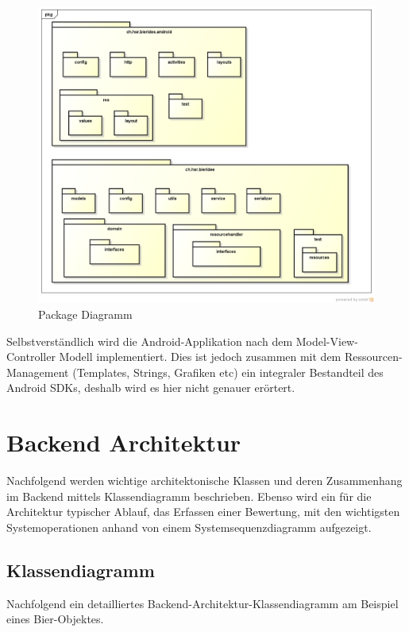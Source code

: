 \documentclass[10pt,a4paper]{scrartcl}
\begin{document}
\begin{figure}[H]
	\includegraphics[width=\textwidth]{PackageDiagramm.png}
	\caption{Package Diagramm}
	\label{fig:package_diagram}
\end{figure}

Selbstverständlich wird die Android-Applikation nach dem Model-View-Controller Modell implementiert.
Dies ist jedoch zusammen mit dem Ressourcen-Management (Templates, Strings, Grafiken etc) ein
integraler Bestandteil des Android SDKs, deshalb wird es hier nicht genauer erörtert.


\newpage
\section{Backend Architektur}
Nachfolgend werden wichtige architektonische Klassen und deren Zusammenhang im Backend mittels Klassendiagramm beschrieben. Ebenso wird ein für die Architektur typischer Ablauf, das Erfassen einer Bewertung, mit den wichtigsten Systemoperationen anhand von einem Systemsequenzdiagramm aufgezeigt.
\subsection{Klassendiagramm}

Nachfolgend ein detailliertes Backend-Architektur-Klassendiagramm am Beispiel eines Bier-Objektes.
\end{document}

